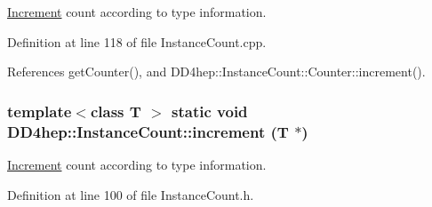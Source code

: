 \hyperlink{struct_d_d4hep_1_1_increment}{Increment} count according to type information. 

Definition at line 118 of file InstanceCount.cpp.

References getCounter(), and DD4hep::InstanceCount::Counter::increment().\hypertarget{struct_d_d4hep_1_1_instance_count_aff4313ae357c0c3bcf3ce210eee4c470}{
\subsubsection[{increment}]{\setlength{\rightskip}{0pt plus 5cm}template$<$class T $>$ static void DD4hep::InstanceCount::increment ({\bf T} $\ast$)}}
\label{struct_d_d4hep_1_1_instance_count_aff4313ae357c0c3bcf3ce210eee4c470}


\hyperlink{struct_d_d4hep_1_1_increment}{Increment} count according to type information. 

Definition at line 100 of file InstanceCount.h.

